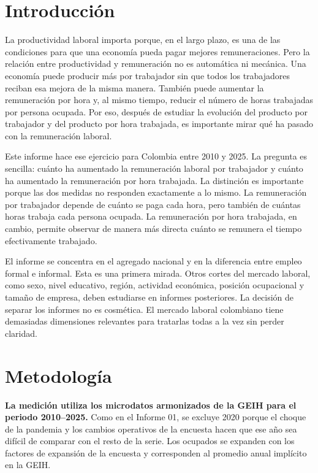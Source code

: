 \section{Introducción}

La productividad laboral importa porque, en el largo plazo, es una de las condiciones para que una economía pueda pagar mejores remuneraciones. Pero la relación entre productividad y remuneración no es automática ni mecánica. Una economía puede producir más por trabajador sin que todos los trabajadores reciban esa mejora de la misma manera. También puede aumentar la remuneración por hora y, al mismo tiempo, reducir el número de horas trabajadas por persona ocupada. Por eso, después de estudiar la evolución del producto por trabajador y del producto por hora trabajada, es importante mirar qué ha pasado con la remuneración laboral.

Este informe hace ese ejercicio para Colombia entre 2010 y 2025. La pregunta es sencilla: cuánto ha aumentado la remuneración laboral por trabajador y cuánto ha aumentado la remuneración por hora trabajada. La distinción es importante porque las dos medidas no responden exactamente a lo mismo. La remuneración por trabajador depende de cuánto se paga cada hora, pero también de cuántas horas trabaja cada persona ocupada. La remuneración por hora trabajada, en cambio, permite observar de manera más directa cuánto se remunera el tiempo efectivamente trabajado.

El informe se concentra en el agregado nacional y en la diferencia entre empleo formal e informal. Esta es una primera mirada. Otros cortes del mercado laboral, como sexo, nivel educativo, región, actividad económica, posición ocupacional y tamaño de empresa, deben estudiarse en informes posteriores. La decisión de separar los informes no es cosmética. El mercado laboral colombiano tiene demasiadas dimensiones relevantes para tratarlas todas a la vez sin perder claridad.

\section{Metodología}

\textbf{La medición utiliza los microdatos armonizados de la GEIH para el periodo 2010--2025.} Como en el Informe 01, se excluye 2020 porque el choque de la pandemia y los cambios operativos de la encuesta hacen que ese año sea difícil de comparar con el resto de la serie. Los ocupados se expanden con los factores de expansión de la encuesta y corresponden al promedio anual implícito en la GEIH.

